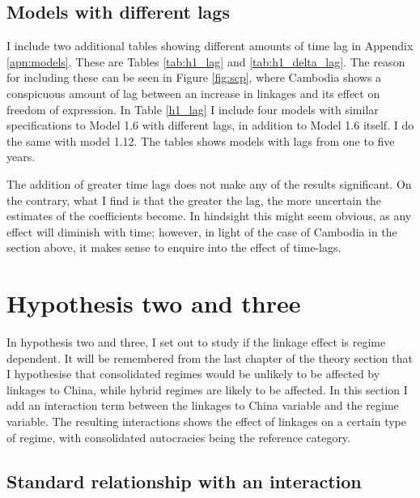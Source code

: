 \subsection{Models with different lags}
I include two additional tables showing different amounts of time lag in Appendix \ref{apn:models}. These are Tables \ref{tab:h1_lag} and \ref{tab:h1_delta_lag}. The reason for including these can be seen in Figure \ref{fig:scp}, where Cambodia shows a conspicuous amount of lag between an increase in linkages and its effect on freedom of expression. In Table \ref{h1_lag} I include four models with similar specifications to Model 1.6 with different lags, in addition to Model 1.6 itself. I do the same with model 1.12. The tables shows models with lags from one to five years. 

The addition of greater time lags does not make any of the results significant. On the contrary, what I find is that the greater the lag, the more uncertain the estimates of the coefficients become. In hindsight this might seem obvious, as any effect will diminish with time; however, in light of the case of Cambodia in the section above, it makes sense to enquire into the effect of time-lags.

\section{Hypothesis two and three} \label{sec:h2}
In hypothesis two and three, I set out to study if the linkage effect is regime dependent. It will be remembered from the last chapter of the theory section that I hypothesise that consolidated regimes would be unlikely to be affected by linkages to China, while hybrid regimes are likely to be affected. In this section I add an interaction term between the linkages to China variable and the regime variable. The resulting interactions shows the effect of linkages on a certain type of regime, with consolidated autocracies being the reference category.

\subsection{Standard relationship with an interaction}

